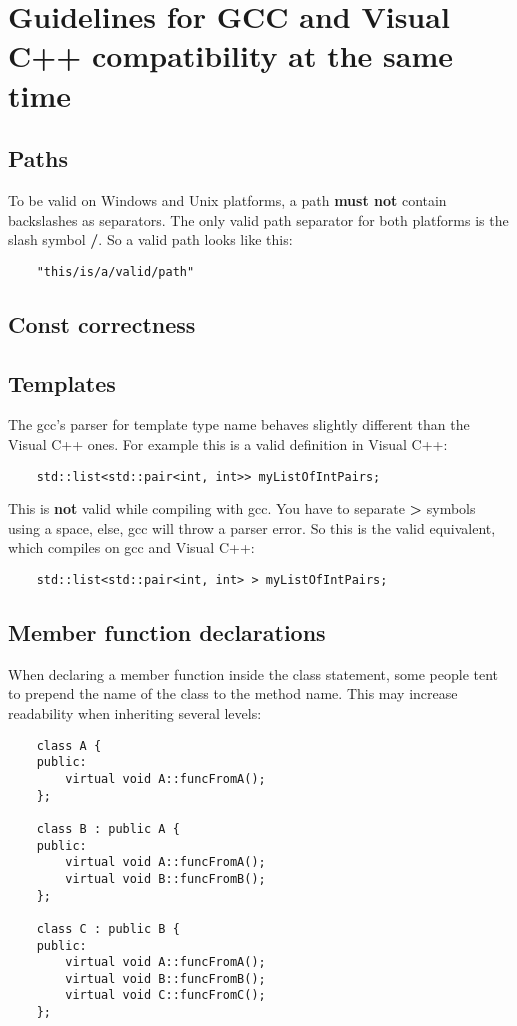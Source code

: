 \section{Guidelines for GCC and Visual C++ compatibility at the same time}

\subsection{Paths} To be valid on Windows and Unix platforms, a path \textbf{must not} contain backslashes as separators. The only valid path separator for both platforms is the slash symbol \textbf{/}. So a valid path looks like this: 
\begin{verbatim}
	"this/is/a/valid/path" 
\end{verbatim}

\subsection{Const correctness} 

\subsection{Templates} The gcc's parser for template type name behaves slightly different than the Visual C++ ones. For example this is a valid definition in Visual C++: 
\begin{verbatim}
	std::list<std::pair<int, int>> myListOfIntPairs; 
\end{verbatim}

This is \textbf{not} valid while compiling with gcc. You have to separate \textbf{>} symbols using a space, else, gcc will throw a parser error. So this is the valid equivalent, which compiles on gcc and Visual C++: 
\begin{verbatim}
	std::list<std::pair<int, int> > myListOfIntPairs; 
\end{verbatim}

\subsection{Member function declarations} When declaring a member function inside the class statement, some people tent to prepend the name of the class to the method name. This may increase readability when inheriting several levels:
\begin{verbatim}
    class A {
    public:
        virtual void A::funcFromA();
    };
    
    class B : public A {
    public:
        virtual void A::funcFromA();
        virtual void B::funcFromB();
    };
    
    class C : public B {
    public:
        virtual void A::funcFromA();
        virtual void B::funcFromB();
        virtual void C::funcFromC();
    };
\end{verbatim}

